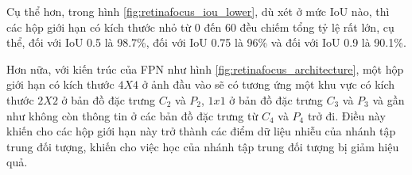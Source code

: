 {    \noindent
    Cụ thể hơn, trong hình \ref{fig:retinafocus_iou_lower}, dù xét ở mức IoU nào, thì các hộp giới hạn có kích thước nhỏ từ 0 đến 60 đều chiếm tổng tỷ lệ rất lớn, cụ thể, đối với IoU 0.5 là 98.7\%, đối với IoU 0.75 là 96\% và đối với IoU 0.9 là 90.1\%.

    \noindent
    Hơn nữa, với kiến trúc của FPN như hình \ref{fig:retinafocus_architecture}, một hộp giới hạn có kích thước $4 X 4$ ở ảnh đầu vào sẽ có tương ứng một khu vực có kích thước $2 X 2$ ở bản đồ đặc trưng ${C}_{2}$ và ${P}_{2}$, $1 x 1$ ở bản đồ đặc trưng ${C}_{3}$ và ${P}_{3}$ và gần như không còn thông tin ở các bản đồ đặc trưng từ ${C}_{4}$ và ${P}_{4}$ trở đi.
    Điều này khiến cho các hộp giới hạn này trở thành các điểm dữ liệu nhiễu của nhánh tập trung đối tượng, khiến cho việc học của nhánh tập trung đối tượng bị giảm hiệu quả.

}
